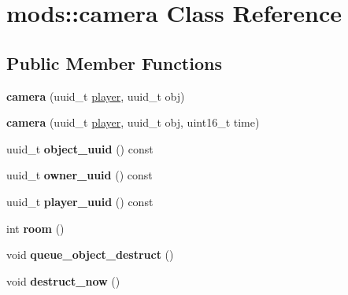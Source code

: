 \hypertarget{classmods_1_1camera}{}\section{mods\+:\+:camera Class Reference}
\label{classmods_1_1camera}
\subsection*{Public Member Functions}
\begin{DoxyCompactItemize}
\item 
\mbox{\label{classmods_1_1camera_a27657864b02c9f7b1539ed7e0a6eee01}} 
{\bfseries camera} (uuid\+\_\+t \hyperlink{classmods_1_1player}{player}, uuid\+\_\+t obj)
\item 
\mbox{\label{classmods_1_1camera_a81af320717d7f513ed676dc75aad13b9}} 
{\bfseries camera} (uuid\+\_\+t \hyperlink{classmods_1_1player}{player}, uuid\+\_\+t obj, uint16\+\_\+t time)
\item 
\mbox{\label{classmods_1_1camera_ab99e4c9318023142f8ce412700aea671}} 
uuid\+\_\+t {\bfseries object\+\_\+uuid} () const
\item 
\mbox{\label{classmods_1_1camera_ad85015b4faf3129fd7ccd6bdc7099ffe}} 
uuid\+\_\+t {\bfseries owner\+\_\+uuid} () const
\item 
\mbox{\label{classmods_1_1camera_a8d91e03c69717abfe231fcc28b218590}} 
uuid\+\_\+t {\bfseries player\+\_\+uuid} () const
\item 
\mbox{\label{classmods_1_1camera_a05ffe269ad3b889117b5e2694ee37648}} 
int {\bfseries room} ()
\item 
\mbox{\label{classmods_1_1camera_aa95535f1066454aca3d6116dfa49ead4}} 
void {\bfseries queue\+\_\+object\+\_\+destruct} ()
\item 
\mbox{\label{classmods_1_1camera_a405f31f7467546e511adba740b9bbcf3}} 
void {\bfseries destruct\+\_\+now} ()
\end{DoxyCompactItemize}
